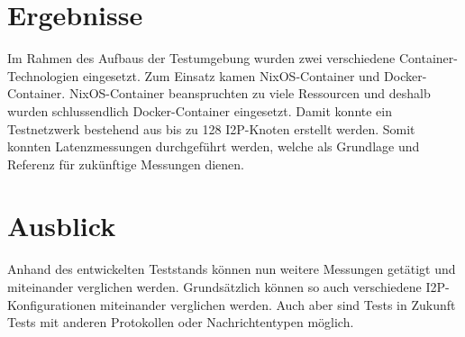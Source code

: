 \documentclass[
	a4paper,10pt
]{scrartcl}
\begin{document}
\section{Ergebnisse}

Im Rahmen des Aufbaus der Testumgebung wurden zwei verschiedene Container-Technologien eingesetzt. Zum Einsatz kamen NixOS-Container und Docker-Container.
NixOS-Container beanspruchten zu viele Ressourcen und deshalb wurden schlussendlich Docker-Container eingesetzt.
Damit konnte ein Testnetzwerk bestehend aus bis zu 128 I2P-Knoten erstellt werden.
Somit konnten Latenzmessungen durchgeführt werden,
welche als Grundlage und Referenz für zukünftige Messungen dienen.

\section{Ausblick}

Anhand des entwickelten Teststands können nun weitere Messungen getätigt und miteinander verglichen werden.
Grundsätzlich können so auch verschiedene I2P-Konfigurationen miteinander verglichen werden.
Auch aber sind Tests in Zukunft Tests mit anderen Protokollen oder Nachrichtentypen möglich.
\end{document}
